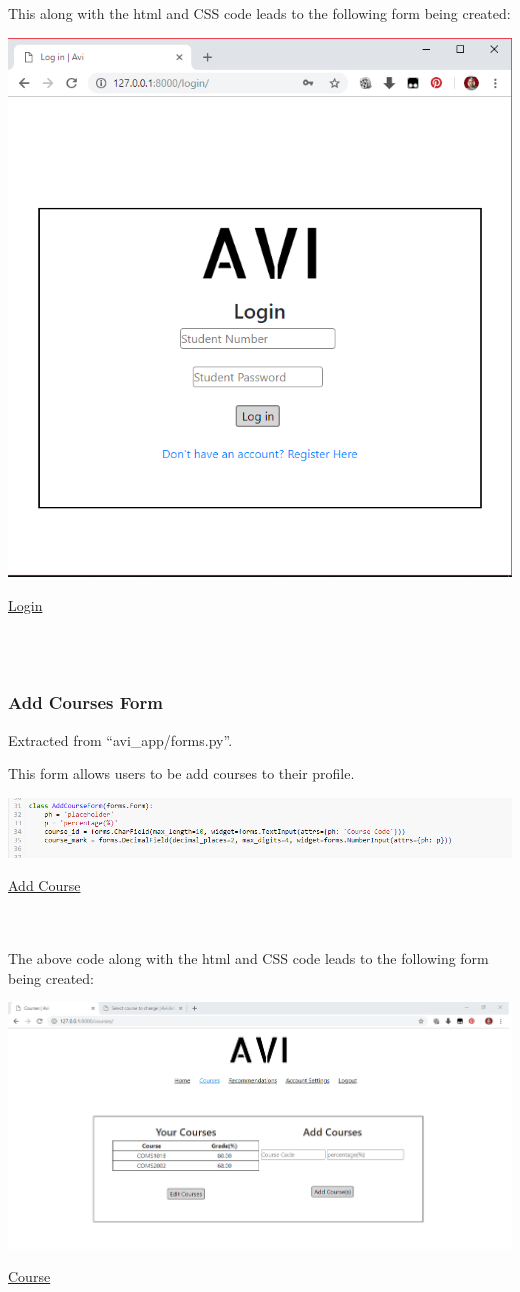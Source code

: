 \documentclass[10pt]{article}
\begin{document}
This along with the html and CSS code leads to the following form being created:

\begin{center}
\includegraphics[width=.4\textwidth]{login_page.png}
\end{center}
\caption{\underline{Login}} \\ \\

\subsubsection{Add Courses Form}
Extracted from “avi\_app/forms.py”.

This form allows users to be add courses to their profile.

\begin{center}
\includegraphics[width=.9\textwidth]{add_course.png}
\end{center}
\caption{\underline{Add Course}} \\ \\

The above code along with the html and CSS code leads to the following form being created:

\begin{center}
\includegraphics[width=.9\textwidth]{course.png}
\end{center}
\caption{\underline{Course}}
\end{document}
